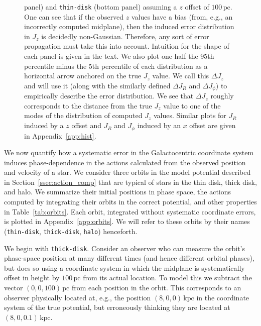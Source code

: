 \documentclass[twocolumn]{aastex62}
\newcommand{\pc}{\text{pc}}
\newcommand{\kpc}{\text{kpc}}
\newcommand{\thin}{\texttt{thin-disk}}
\newcommand{\thick}{\texttt{thick-disk}}
\newcommand{\halo}{\texttt{halo}}
\begin{document}
\begin{figure}
{panel) and \thin{} (bottom panel) assuming a $z$ offset of
$100\,\pc$. One can see that if the observed $z$ values have a bias (from, e.g.,
an incorrectly computed midplane), then the induced error distribution in
$J_z$ is decidedly non-Gaussian. Therefore, any sort of error propagation must
take this into account. Intuition for the shape of each panel is given in the
text. We also plot one half the 95th percentile minus the 5th
percentile of each distribution as a horizontal arrow anchored on the true
$J_z$ value. We call this $\Delta J_z$ and will use it (along with the
similarly defined $\Delta J_R$ and $\Delta J_{\phi}$) to empirically describe
the error distribution. We see that $\Delta J_z$ roughly corresponds to the
distance from the true $J_z$ value to one of the modes of the distribution of
computed $J_z$ values. Similar plots for $J_R$ induced by a $z$ offset and
$J_R$ and $J_{\phi}$ induced by an $x$ offset are given in
Appendix~\ref{app:hist}.}
\label{fig:Jz_hist}
\end{figure}

We now quantify how a systematic error in the Galactocentric coordinate system
induces phase-dependence in the actions calculated from the observed position and velocity of a star. We consider
three orbits in the model potential described in
Section~\ref{ssec:action_comp} that are typical of stars in the thin
disk, thick disk, and halo. We summarize their initial
positions in phase space, the actions computed by integrating their orbits
in the correct potential, and other properties in Table~\ref{tab:orbits}. Each orbit, integrated
without systematic coordinate errors, is plotted in Appendix~\ref{app:orbits}.
We will refer to these orbits by their names (\thin{}, \thick{}, \halo{})
henceforth.

We begin with \thick{}. Consider an observer who can
measure the orbit's phase-space position at many different times
(and hence different orbital phases), but does so using a
coordinate system in which the midplane is systematically offset in height by
$100\,\pc$ from its actual location. To model this we subtract the vector $(0, 0,
100)\,\pc$ from each position in the orbit. This corresponds to an
observer physically located at, e.g., the position $(8, 0, 0)\,\kpc$ in the
coordinate system of the true potential, but erroneously thinking they are
located at $(8, 0, 0.1)\,\kpc$.
\end{document}

